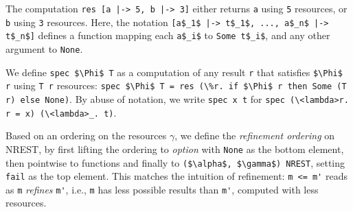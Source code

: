 \documentclass[acmsmall]{acmart}
\newcommand{\is}{\lstinline[language=isabelle]}
\begin{document}
\begin{example}
The computation \is{res [a |-> 5, b |-> 3]} either returns \is{a} using \is{5} resources, or \is{b} using \is{3} resources. 
Here, the notation \is{[a$_1$ |-> t$_1$, ..., a$_n$ |-> t$_n$]} defines a function mapping each \is{a$_i$} to \is{Some t$_i$}, and any other argument to \is$None$.
\end{example}














We define \is{spec $\Phi$ T} as a computation 
of any result \is{r} that satisfies \is{$\Phi$ r} using \is{T r} resources: \is{spec $\Phi$ T = res (\%r. if $\Phi$ r then Some (T r) else None)}.
By abuse of notation, we write \is{spec x t} for \is{spec (\<lambda>r. r = x) (\<lambda>_. t)}.

Based on an ordering on the resources $\gamma$, we define the \emph{refinement ordering} on NREST, 
by first lifting the ordering to \emph{option} with \is{None} as the bottom element, then pointwise to functions and finally to \is{($\alpha$, $\gamma$) NREST}, setting \is{fail} as the top element. This matches the intuition of refinement: \is$m <= m'$ reads as \is{m} \emph{refines} \is{m'}, i.e., \is$m$ has less possible results than \is$m'$, computed with less resources. 
\end{document}
